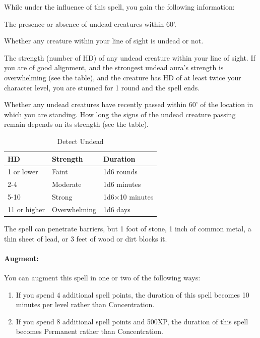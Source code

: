 While under the influence of this spell, you gain the following information:
\begin{list}{}{\leftmargin=1em}
 \item The presence or absence of undead creatures within 60'.
 \item Whether any creature within your line of sight is undead or not.
 \item The strength (number of HD) of any undead creature within your line of sight.
If you are of good alignment, and the strongest undead aura's strength is overwhelming (see the  table), 
and the creature has HD of at least twice your character level, you are stunned for 1 round and the spell ends.
 \item Whether any undead creatures have recently passed within 60' of the location in which you are standing.
How long the signs of the undead creature passing remain depends on its strength (see the  table).
\end{list}
\begin{table}
\label{tab:DetectUndead}
\caption{Detect Undead}
\centering
\begin{tabular}{|lll|}
\hline
HD&Strength&Duration\\
\hline
1 or lower&Faint&1d6 rounds\\
2-4&Moderate&1d6 minutes\\
5-10&Strong&1d6$\times$10 minutes\\
11 or higher&Overwhelming& 1d6 days\\
\hline
\end{tabular}
\end{table}
The spell can penetrate barriers, but 1 foot of stone, 
1 inch of common metal, a thin sheet of lead, or 3 feet of wood or dirt blocks it.

\paragraph{Augment:} You can augment this spell in one or two of the following ways:
\begin{enumerate}
\item If you spend 4 additional spell points, the duration of this spell becomes 10 minutes per level rather than Concentration.
\item If you spend 8 additional spell points and 500XP, the duration of this spell becomes Permanent rather than Concentration.
\end{enumerate}
